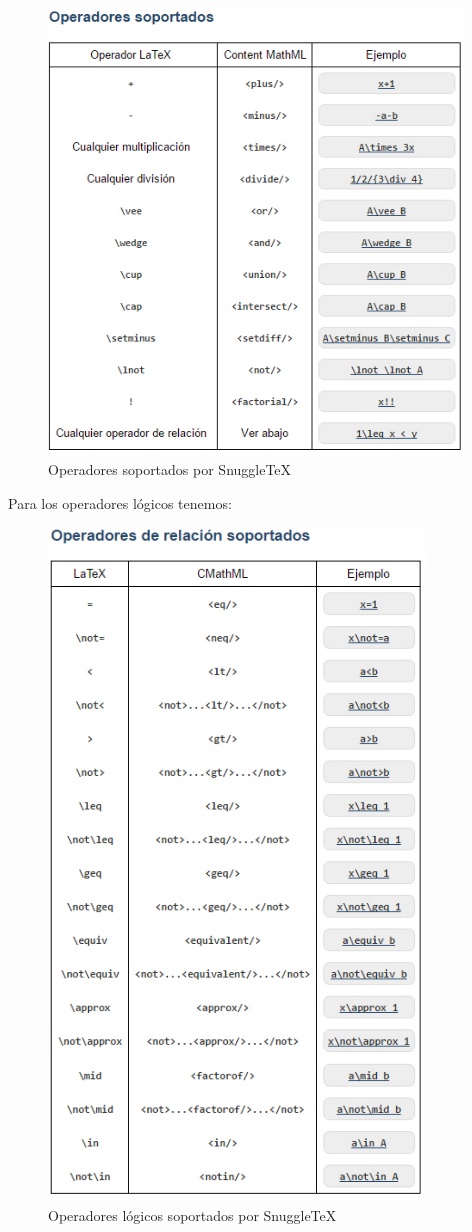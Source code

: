 \begin{figure}[H]
\centering
  \includegraphics[width=11cm, height=11.84cm]{Figures/opsoportados}
  \caption[]{Operadores soportados por SnuggleTeX}
\label{fig:opsoportados}
\end{figure}

Para los operadores lógicos tenemos:

\begin{figure}[H]
\centering
  \includegraphics[width=10cm, height=17.84cm]{Figures/reloperatorsoportados}
  \caption[]{Operadores lógicos soportados por SnuggleTeX}
\label{fig:opsoportados}
\end{figure}

